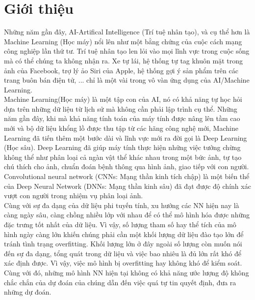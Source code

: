 \chapter{Giới thiệu}  %

\ifpdf
    \graphicspath{{Chapter1/Figs/Raster/}{Chapter1/Figs/PDF/}{Chapter1/Figs/}}
\else
    \graphicspath{{Chapter1/Figs/Vector/}{Chapter1/Figs/}}
\fi



Những năm gần đây, AI-Artifical Intelligence (Trí tuệ nhân tạo), và cụ thể hơn là Machine Learning (Học máy) nổi lên như một bằng chứng của cuộc cách mạng công nghiệp lần thứ tư. Trí tuệ nhân tạo len lỏi vào mọi lĩnh vực trong cuộc sống mà có thể chúng ta không nhận ra. Xe tự lái, hệ thống tự tag khuôn mặt trong ảnh của Facebook, trợ lý ảo Siri của Apple, hệ thống gợi ý sản phẩm trên các trang buôn bán điện tử, ... chỉ là một vài trong vô vàn ứng dụng của AI/Machine Learning.\\
Machine Learning(Học máy) là một tập con của AI, nó có khả năng tự học hỏi dựa trên những dữ liệu từ lịch sử mà không cần phải lập trình cụ thể. Những năm gần đây, khi mà khả năng tính toán của máy tính được nâng lên tầm cao mới và bộ dữ liệu khổng lồ được thu tập từ các hãng công nghệ mới, Machine Learning đã tiến thêm một bước dài và lĩnh vực mới ra đời gọi là Deep Learning (Học sâu). Deep Learning đã giúp máy tính thực hiện những việc tưởng chừng không thể như phân loại cả ngàn vật thể khác nhau trong một bức ảnh, tự tạo chú thích cho ảnh, chuẩn đoán bệnh thông qua hình ảnh, giao tiếp với con người. Convolutional neural network (CNNs: Mạng thần kinh tích chập) là một biến thể của Deep Neural Network (DNNs: Mạng thần kinh sâu) đã đạt được độ chính xác vượt con người trong nhiệm vụ phân loại ảnh.\\
Cùng với sự đa dạng của dữ liệu phi tuyến tính, xu hướng các NN hiện nay là càng ngày sâu, càng chồng nhiều lớp với nhau để có thể mô hình hóa được những đặc trưng tốt nhất của dữ liệu. Vì vậy, số lượng tham số hay thể tích của mô hình ngày càng lớn khiến chúng phải cần một khối lượng dữ liệu đào tạo lớn để tránh tình trạng overfitting. Khối lượng lớn ở đây ngoài số lượng còn muốn nói đến sự đa dạng, tổng quát trong dữ liệu và việc bao nhiêu là đủ lớn rất khó để xác định được. Vì vậy, việc mô hình bị overfitting hay không khó để kiểm soát. Cùng với đó, những mô hình NN hiện tại không có khả năng ước lượng độ không chắc chắn của dự đoán của chúng dẫn đến việc quá tự tin quyết định, đưa ra những dự đoán.\\

